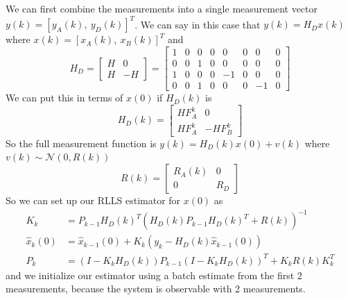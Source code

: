 \documentclass[11pt]{article}
\begin{document}
\subparagraph*{}
We can first combine the measurements into a single measurement vector $y(k)=[y_A(k),\ y_D(k)]^T$. We can say in this case that $y(k) = H_Dx(k)$ where $x(k) = [x_A(k),\ x_B(k)]^T$ and
\begin{equation*}
	H_D = \begin{bmatrix} H & 0 \\ H & -H \end{bmatrix} = \begin{bmatrix} 1&0&0&0&0&0&0&0 \\ 0&0&1&0&0&0&0&0 \\ 1&0&0&0&-1&0&0&0 \\ 0&0&1&0&0&0&-1&0 \end{bmatrix}
\end{equation*}
We can put this in terms of $x(0)$ if $H_D(k)$ is 
\begin{equation*}
	H_D(k) = \begin{bmatrix} HF_A^k & 0 \\ HF_A^k & -HF_B^k \end{bmatrix}
\end{equation*}
So the full measurement function is $y(k)=H_D(k)x(0)+v(k)$ where $v(k)\sim\mathcal{N}(0,R(k))$
\begin{equation*}
	R(k) = \begin{bmatrix} R_A(k) & 0 \\ 0 & R_D \end{bmatrix}
\end{equation*}
So we can set up our RLLS estimator for $x(0)$ as 
\begin{align*}
	K_k &= P_{k-1}H_D(k)^T(H_D(k)P_{k-1}H_D(k)^T + R(k))^{-1} \\
	\hat{x}_k(0) &= \hat{x}_{k-1}(0) + K_k(y_k-H_D(k)\hat{x}_{k-1}(0)) \\
	P_k &= (I-K_kH_D(k))P_{k-1}(I-K_kH_D(k))^T + K_kR(k)K_k^T
\end{align*}
and we initialize our estimator using a batch estimate from the first 2 measurements, because the system is observable with 2 measurements.
\end{document}
